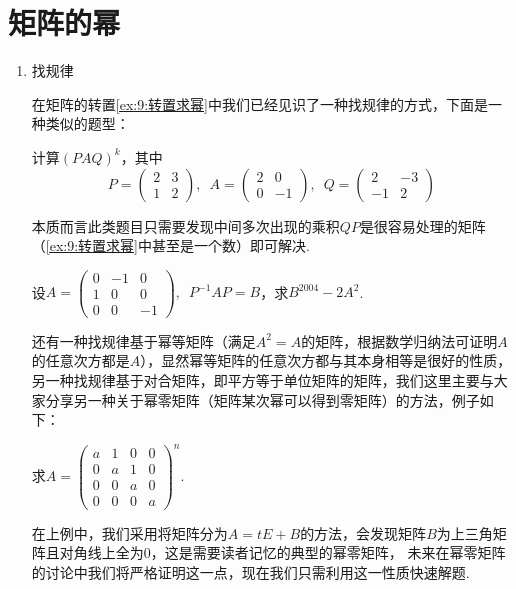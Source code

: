 \section{矩阵的幂}
\begin{enumerate}
    \item 找规律

    在矩阵的转置\autoref{ex:9:转置求幂}中我们已经见识了一种找规律的方式，下面是一种类似的题型：
    \begin{example}
        计算$(PAQ)^k$，其中
        \[P=\begin{pmatrix}2 & 3 \\ 1 & 2\end{pmatrix},\enspace A=\begin{pmatrix}2 & 0 \\ 0 & -1\end{pmatrix},\enspace Q=\begin{pmatrix}2 & -3 \\ -1 & 2\end{pmatrix}\]
    \end{example}
    本质而言此类题目只需要发现中间多次出现的乘积$QP$是很容易处理的矩阵（\autoref{ex:9:转置求幂}中甚至是一个数）即可解决.
    \begin{solution}

    \end{solution}

    \begin{example}
        设$A=\begin{pmatrix}0 & -1 & 0 \\ 1 & 0 & 0 \\ 0 & 0 & -1 \end{pmatrix},\enspace P^{-1}AP=B$，求$B^{2004}-2A^2$.
    \end{example}
    \begin{solution}

    \end{solution}

    还有一种找规律基于幂等矩阵（满足$A^2=A$的矩阵，根据数学归纳法可证明$A$的任意次方都是$A$），显然幂等矩阵的任意次方都与其本身相等是很好的性质，
    另一种找规律基于对合矩阵，即平方等于单位矩阵的矩阵，我们这里主要与大家分享另一种关于幂零矩阵（矩阵某次幂可以得到零矩阵）的方法，例子如下：
    \begin{example}
        求$A=\begin{pmatrix}a & 1 & 0 & 0 \\ 0 & a & 1 & 0 \\ 0 & 0 & a & 0 \\ 0 & 0 & 0 & a \end{pmatrix}^n$.
    \end{example}
    在上例中，我们采用将矩阵分为$A=tE+B$的方法，会发现矩阵$B$为上三角矩阵且对角线上全为0，这是需要读者记忆的典型的幂零矩阵，
    未来在幂零矩阵的讨论中我们将严格证明这一点，现在我们只需利用这一性质快速解题.
    

\end{enumerate}

